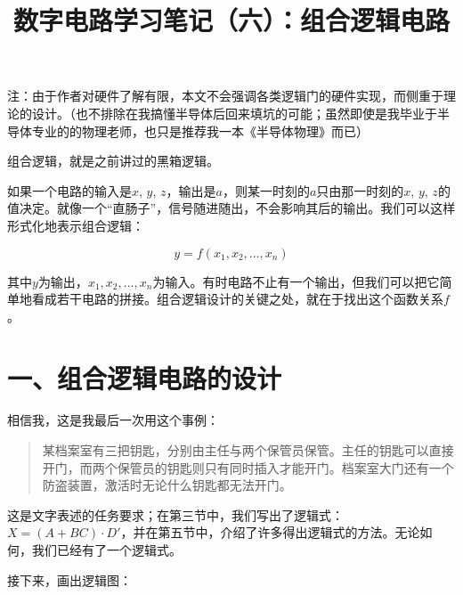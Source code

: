 \documentclass[UTF8]{ctexart}
\title{数字电路学习笔记（六）：组合逻辑电路}
\begin{document}
\maketitle
注：由于作者对硬件了解有限，本文不会强调各类逻辑门的硬件实现，而侧重于理论的设计。（也不排除在我搞懂半导体后回来填坑的可能；虽然即使是我毕业于半导体专业的的物理老师，也只是推荐我一本《半导体物理》而已）

组合逻辑，就是之前讲过的黑箱逻辑。

\begin{figure}
\end{figure}

如果一个电路的输入是$x$, $y$, $z$，输出是$a$，则某一时刻的$a$只由那一时刻的$x$, $y$, $z$的值决定。就像一个“直肠子”，信号随进随出，不会影响其后的输出。我们可以这样形式化地表示组合逻辑：

\[y=f(x_1,x_2,\dots,x_n)\]

其中$y$为输出，$x_1,x_2,\dots,x_n$为输入。有时电路不止有一个输出，但我们可以把它简单地看成若干电路的拼接。组合逻辑设计的关键之处，就在于找出这个函数关系$f$。

\section*{一、组合逻辑电路的设计}

相信我，这是我最后一次用这个事例：

\begin{quote}
某档案室有三把钥匙，分别由主任与两个保管员保管。主任的钥匙可以直接开门，而两个保管员的钥匙则只有同时插入才能开门。档案室大门还有一个防盗装置，激活时无论什么钥匙都无法开门。
\end{quote}

这是文字表述的任务要求；在第三节中，我们写出了逻辑式：$X=(A+BC)\cdot D'$，并在第五节中，介绍了许多得出逻辑式的方法。无论如何，我们已经有了一个逻辑式。

接下来，画出逻辑图：
\end{document}
